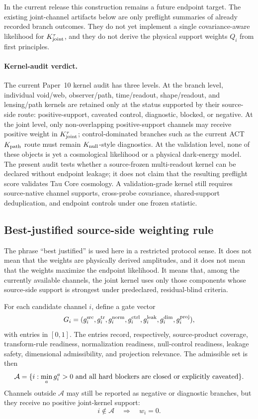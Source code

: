 \documentclass[11pt]{article}
\begin{document}
In the current release this construction remains a future endpoint target.
The existing joint-channel artifacts below are only preflight summaries of
already recorded branch outcomes.  They do not yet implement a single
covariance-aware likelihood for \(K_{\rm joint}^{\tau}\), and they do not
derive the physical support weights \(Q_i\) from first principles.

\paragraph{Kernel-audit verdict.}
The current Paper~10 kernel audit has three levels.  At the branch level,
individual void/web, observer/path, time/readout, shape/readout, and
lensing/path kernels are retained only at the status supported by their
source-side route: positive-support, caveated control, diagnostic, blocked, or
negative.  At the joint level, only non-overlapping positive-support channels
may receive positive weight in \(K_{\rm joint}^{\tau}\); control-dominated
branches such as the current ACT \(K_{\rm path}\) route must remain
\(K_{\rm null}\)-style diagnostics.  At the validation level, none of these
objects is yet a cosmological likelihood or a physical dark-energy model.  The
present audit tests whether a source-frozen multi-readout kernel can be
declared without endpoint leakage; it does not claim that the resulting
preflight score validates Tau Core cosmology.  A validation-grade kernel still
requires source-native channel supports, cross-probe covariance,
shared-support deduplication, and endpoint controls under one frozen statistic.

\subsection{Best-justified source-side weighting rule}

The phrase ``best justified'' is used here in a restricted protocol sense.  It
does not mean that the weights are physically derived amplitudes, and it does
not mean that the weights maximize the endpoint likelihood.  It means that,
among the currently available channels, the joint kernel uses only those
components whose source-side support is strongest under predeclared,
residual-blind criteria.

For each candidate channel \(i\), define a gate vector
\begin{equation}
G_i=
(g^{\rm src}_i,g^{\rm tr}_i,g^{\rm norm}_i,g^{\rm ctrl}_i,
g^{\rm leak}_i,g^{\rm dim}_i,g^{\rm proj}_i),
\end{equation}
with entries in \([0,1]\).  The entries record, respectively, source-product
coverage, transform-rule readiness, normalization readiness, null-control
readiness, leakage safety, dimensional admissibility, and projection relevance.
The admissible set is then
\begin{equation}
\mathcal A
=
\{i:\min_a g_i^a>0\hbox{ and all hard blockers are closed or explicitly
caveated}\}.
\end{equation}
Channels outside \(\mathcal A\) may still be reported as negative or
diagnostic branches, but they receive no positive joint-kernel support:
\[
i\notin\mathcal A \quad\Rightarrow\quad w_i=0.
\]
\end{document}
